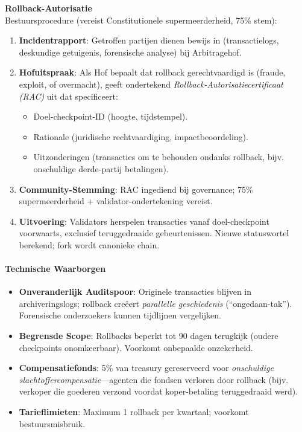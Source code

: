 \documentclass[11pt]{article}
\begin{document}
\textbf{Rollback-Autorisatie}\\
Bestuursprocedure (vereist Constitutionele supermeerderheid, 75\% stem):
\begin{enumerate}[noitemsep]
  \item \textbf{Incidentrapport}: Getroffen partijen dienen bewijs in (transactielogs, deskundige getuigenis, forensische analyse) bij Arbitragehof.
  \item \textbf{Hofuitspraak}: Als Hof bepaalt dat rollback gerechtvaardigd is (fraude, exploit, of overmacht), geeft ondertekend \emph{Rollback-Autorisatiecertificaat (RAC)} uit dat specificeert:
    \begin{itemize}[noitemsep]
      \item Doel-checkpoint-ID (hoogte, tijdstempel).
      \item Rationale (juridische rechtvaardiging, impactbeoordeling).
      \item Uitzonderingen (transacties om te behouden ondanks rollback, bijv. onschuldige derde-partij betalingen).
    \end{itemize}
  \item \textbf{Community-Stemming}: RAC ingediend bij governance; 75\% supermeerderheid + validator-ondertekening vereist.
  \item \textbf{Uitvoering}: Validators herspelen transacties vanaf doel-checkpoint voorwaarts, exclusief teruggedraaide gebeurtenissen. Nieuwe statuswortel berekend; fork wordt canonieke chain.
\end{enumerate}

\paragraph{Technische Waarborgen}
\begin{itemize}[noitemsep]
  \item \textbf{Onveranderlijk Auditspoor}: Originele transacties blijven in archiveringslogs; rollback creëert \emph{parallelle geschiedenis} (``ongedaan-tak''). Forensische onderzoekers kunnen tijdlijnen vergelijken.
  \item \textbf{Begrensde Scope}: Rollbacks beperkt tot 90 dagen terugkijk (oudere checkpoints onomkeerbaar). Voorkomt onbepaalde onzekerheid.
  \item \textbf{Compensatiefonds}: 5\% van treasury gereserveerd voor \emph{onschuldige slachtoffercompensatie}—agenten die fondsen verloren door rollback (bijv. verkoper die goederen verzond voordat koper-betaling teruggedraaid werd).
  \item \textbf{Tarieflimieten}: Maximum 1 rollback per kwartaal; voorkomt bestuursmisbruik.
\end{itemize}
\end{document}
